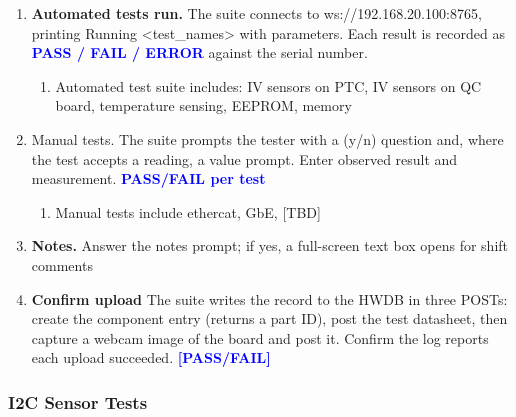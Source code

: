 \documentclass[a4paper,12pt]{article}
\begin{document}
\begin{enumerate}
        \item \textbf{Automated tests run.} The suite connects to ws://192.168.20.100:8765, printing Running <test\_names> with parameters. Each result is recorded as \textcolor{blue} {\textbf {PASS / FAIL / ERROR}} against the serial number.
            \begin{enumerate}
                \item Automated test suite includes: IV sensors on PTC, IV sensors on QC board, temperature sensing, EEPROM,  memory 
            \end{enumerate}
        \item Manual tests. The suite prompts the tester with a (y/n) question and, where the test accepts a reading, a value prompt. Enter observed result and measurement. \textcolor{blue} {\textbf {PASS/FAIL per test}}
            \begin{enumerate}
                \item Manual tests include ethercat, GbE, [TBD] 
            \end{enumerate}
        \item \textbf{Notes.} Answer the notes prompt; if yes, a full-screen text box opens for shift comments
        \item \textbf{Confirm upload} The suite writes the record to the HWDB in three POSTs: create the component entry (returns a part ID), post the test datasheet, then capture a webcam image of the board and post it. Confirm the log reports each upload succeeded. \textcolor{blue} {\textbf {[PASS/FAIL]}}

    \end{enumerate}

\subsubsection{I2C Sensor Tests}
\label{section:i2c_tests}
\end{document}
